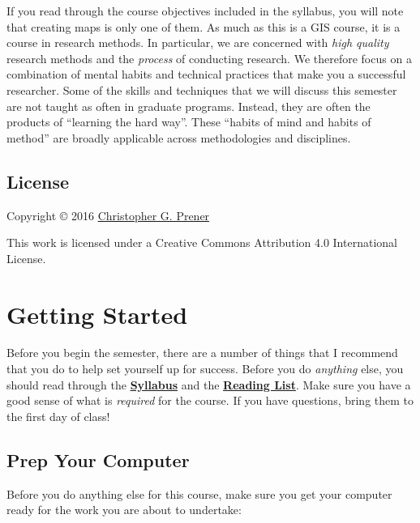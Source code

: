 \documentclass[]{book}
\begin{document}
If you read through the course objectives included in the syllabus, you
will note that creating maps is only one of them. As much as this is a
GIS course, it is a course in research methods. In particular, we are
concerned with \emph{high quality} research methods and the
\emph{process} of conducting research. We therefore focus on a
combination of mental habits and technical practices that make you a
successful researcher. Some of the skills and techniques that we will
discuss this semester are not taught as often in graduate programs.
Instead, they are often the products of ``learning the hard way''. These
``habits of mind and habits of method'' are broadly applicable across
methodologies and disciplines.

\section*{License}\label{license}

Copyright © 2016 \href{http://chrisprener.net}{Christopher G. Prener}

This work is licensed under a Creative Commons Attribution 4.0
International License.

\chapter{Getting Started}\label{gettingStarted}

Before you begin the semester, there are a number of things that I
recommend that you do to help set yourself up for success. Before you do
\emph{anything} else, you should read through the
\href{}{\textbf{Syllabus}} and the \href{}{\textbf{Reading List}}. Make
sure you have a good sense of what is \emph{required} for the course. If
you have questions, bring them to the first day of class!

\section{Prep Your Computer}\label{prep-your-computer}

Before you do anything else for this course, make sure you get your
computer ready for the work you are about to undertake:
\end{document}
